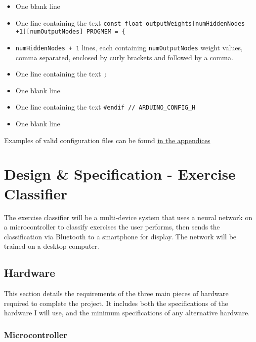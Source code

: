 \documentclass[a4paper]{article}
\begin{document}
\begin{itemize}
\item One blank line
\item One line containing the text \lstinline|const float outputWeights[numHiddenNodes +1][numOutputNodes] PROGMEM = {|
\item \lstinline{numHiddenNodes + 1} lines, each containing \lstinline{numOutputNodes} weight values, comma separated, enclosed by curly brackets and followed by a comma.
\item One line containing the text \lstinline|;|
\item One blank line
\item One line containing the text \lstinline{#endif // ARDUINO_CONFIG_H}
\item One blank line
\end{itemize}

Examples of valid configuration files can be found \hyperref[subsec:a2_configfiles]{in the appendices}

\newpage
\section{Design \& Specification - Exercise Classifier}
\label{sec:dc}

The exercise classifier will be a multi-device system that uses a neural network on a microcontroller to classify exercises the user performs, then sends the classification via Bluetooth to a smartphone for display. The network will be trained on a desktop computer.


\subsection{Hardware}%
\label{subsec:dc_hardware}

This section details the requirements of the three main pieces of hardware required to complete the project. It includes both the specifications of the hardware I will use, and the minimum specifications of any alternative hardware.

\subsubsection{Microcontroller}
\end{document}
